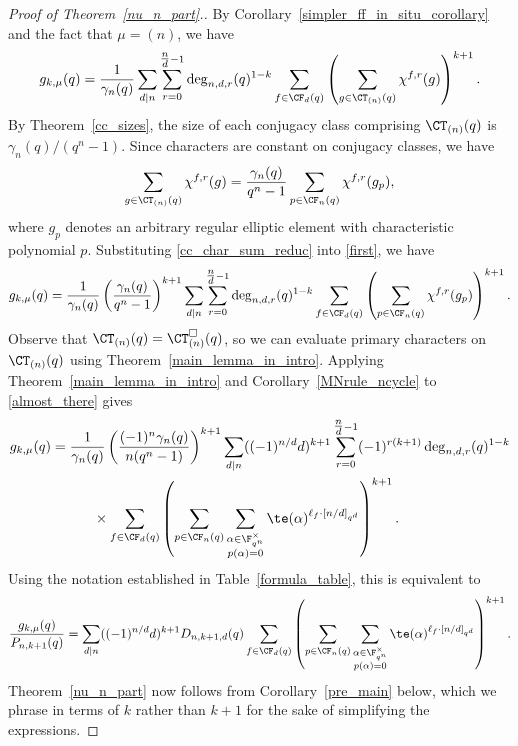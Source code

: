 \begin{proof}[Proof of Theorem~\ref{nu_n_part}.]
By Corollary~\ref{simpler_ff_in_situ_corollary} and the fact that \(\mu = (n)\), we have
\begin{equation}
\label{first}
g_{k,\mu} (q)
=
\frac{1}{\gamma_n(q)}
\sum_{d \mid n}
\sum_{r=0}^{\tfrac{n}{d}-1}
\deg_{n,d,r}(q)^{1-k}
\sum_{f \in \CF_d (q)}
\left ( \sum_{g \in \CT_{(n)} (q)} \chi^{f,r}(g) \right )^{k+1}.
\end{equation}
By Theorem~\ref{cc_sizes}, the size of each conjugacy class comprising \(\CT_{(n)} (q)\) is \(\gamma_n(q) / (q^n-1)\).
Since characters are constant on conjugacy classes, we have
\begin{equation}
\sum_{g \in \CT_{(n)} (q)}
\chi^{f,r} (g)
=
\frac{\gamma_n(q)}{q^n-1} \sum_{p \in \CF_n (q)} \chi^{f,r}(g_p),
\label{cc_char_sum_reduc}
\end{equation}
where \(g_p\) denotes an arbitrary regular elliptic element with characteristic polynomial \(p\).
Substituting \eqref{cc_char_sum_reduc} into \eqref{first}, we have
\begin{equation}
\label{almost_there}
g_{k,\mu} (q)
=
\frac{1}{\gamma_n(q) }
\left ( \frac{\gamma_n(q)}{q^n-1} \right )^{k+1}
\sum_{d \mid n}
\sum_{r = 0}^{\tfrac{n}{d} - 1} \deg_{n,d,r}(q)^{1-k} \sum_{f \in \CF_d (q)} \left ( \sum_{p \in \CF_n (q)} \chi^{f,r}(g_p) \right )^{k+1}.
\end{equation}
Observe that \(\CT_{(n)} (q) = \CT_{(n)}^\Box (q)\), so we can evaluate primary characters on \(\CT_{(n)} (q)\) using Theorem~\ref{main_lemma_in_intro}.
Applying Theorem~\ref{main_lemma_in_intro} and Corollary~\ref{MNrule_ncycle} to \eqref{almost_there} gives
\begin{align*}
g_{k,\mu} (q)
& =
\frac{1}{\gamma_n(q) }
\left ( \frac{(-1)^n \gamma_n(q)}{n(q^n-1)} \right )^{k+1}
\sum_{d \mid n} ((-1)^{n/d} d)^{k+1}
\sum_{r = 0}^{\tfrac{n}{d} - 1} (-1)^{r(k+1)} \deg_{n,d,r}(q)^{1-k} \\
& \quad \quad \quad \times
\sum_{f \in \CF_d (q)} \left ( \sum_{p \in \CF_n (q)} \sum_{\substack{\alpha \in \F_{q^n}^\times \\ p(\alpha) = 0}}
\te(\alpha)^{\ell_f \cdot [n/d]_{q^d}} \right )^{k+1}.
\end{align*}
Using the notation established in Table~\ref{formula_table}, this is equivalent to
\begin{equation}
\frac{g_{k,\mu} (q)}{P_{n,k+1}(q)}
=
\sum_{d \mid n} ((-1)^{n/d} d)^{k+1}
D_{n,k+1,d}(q)
\sum_{f \in \CF_d (q)} \left ( \sum_{p \in \CF_n (q)} \sum_{\substack{\alpha \in \F_{q^n}^\times \\ p(\alpha) = 0}}
\te(\alpha)^{\ell_f \cdot [n/d]_{q^d}} \right )^{k+1}.
\end{equation}
Theorem~\ref{nu_n_part} now follows from Corollary~\ref{pre_main} below, which we phrase in terms of \(k\) rather than \(k+1\) for the sake of simplifying the expressions.
\end{proof}




